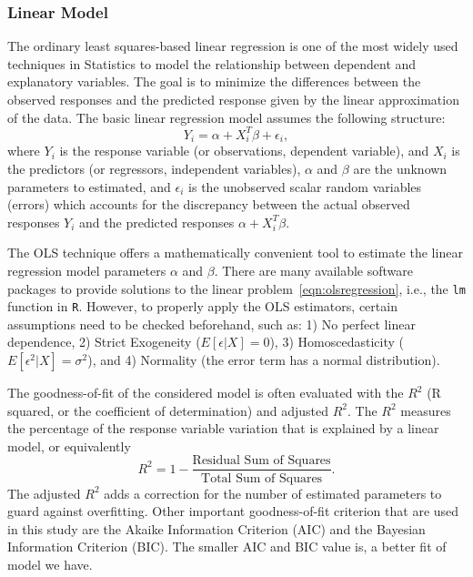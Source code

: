 \documentclass [11pt, proquest] {uwthesis}[2015/03/03]
\begin{document}
\subsubsection{\textbf{Linear Model}}
The ordinary least squares-based linear regression is one of the most widely used techniques in Statistics to model the relationship between dependent and explanatory variables. The goal is to minimize the differences between the observed responses and the predicted response given by the linear approximation of the data. The basic linear regression model assumes the following structure:
\begin{equation}
Y_i = \alpha + X_i^T \beta + \epsilon_i, \label{eqn:olsregression}
\end{equation}
where $Y_i$ is the response variable (or observations, dependent variable), and $X_i$ is the predictors (or regressors, independent variables), $\alpha$ and $\beta$ are the unknown parameters to estimated, and $\epsilon_i$ is the unobserved scalar random variables (errors) which accounts for the discrepancy between the actual observed responses $Y_i$ and the predicted responses $\alpha +  X_i^T \beta$.  

The OLS technique offers a mathematically convenient tool to estimate the linear regression model parameters $\alpha$ and $\beta$. There are many available software packages to provide solutions to the linear problem~\eqref{eqn:olsregression}, i.e., the \texttt{lm} function in \texttt{R}. However, to properly apply the OLS estimators, certain assumptions need to be checked beforehand, such as: 1) No perfect linear dependence, 2) Strict Exogeneity ($E[\epsilon|X]=0$), 3) Homoscedasticity ($E[\epsilon^2|X]=\sigma^2$), and 4) Normality (the error term has a normal distribution).

The goodness-of-fit of the considered model is often evaluated with the $R^2$ (R squared, or the coefficient of determination) and adjusted $R^2$. The $R^2$ measures the percentage of the response variable variation that is explained by a linear model, or equivalently
\begin{equation}
R^2 = 1- \frac{\text{Residual Sum of Squares}}{\text{Total Sum of Squares}}.\label{eqn:R2}
\end{equation}
The adjusted $R^2$ adds a correction for the number of estimated parameters to guard against overfitting. Other important goodness-of-fit criterion that are used in this study are the Akaike Information Criterion (AIC) and the Bayesian Information Criterion (BIC). The smaller AIC and BIC value is, a better fit of model we have. 
\end{document}
